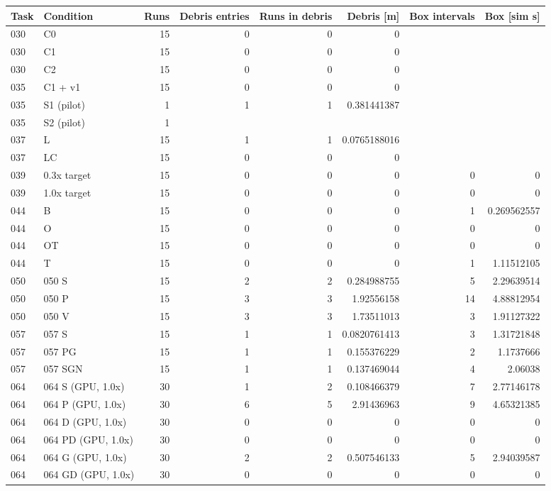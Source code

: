 \begin{tabular}{llrrrrrr}
\hline
Task & Condition & Runs & Debris entries & Runs in debris & Debris [m] & Box intervals & Box [sim s] \\
\hline
030 & C0 & 15 & 0 & 0 & 0 & \textemdash{} & \textemdash{} \\
030 & C1 & 15 & 0 & 0 & 0 & \textemdash{} & \textemdash{} \\
030 & C2 & 15 & 0 & 0 & 0 & \textemdash{} & \textemdash{} \\
035 & C1 + v1 & 15 & 0 & 0 & 0 & \textemdash{} & \textemdash{} \\
035 & S1 (pilot) & 1 & 1 & 1 & 0.381441387 & \textemdash{} & \textemdash{} \\
035 & S2 (pilot) & 1 & \textemdash{} & \textemdash{} & \textemdash{} & \textemdash{} & \textemdash{} \\
037 & L & 15 & 1 & 1 & 0.0765188016 & \textemdash{} & \textemdash{} \\
037 & LC & 15 & 0 & 0 & 0 & \textemdash{} & \textemdash{} \\
039 & 0.3x target & 15 & 0 & 0 & 0 & 0 & 0 \\
039 & 1.0x target & 15 & 0 & 0 & 0 & 0 & 0 \\
044 & B & 15 & 0 & 0 & 0 & 1 & 0.269562557 \\
044 & O & 15 & 0 & 0 & 0 & 0 & 0 \\
044 & OT & 15 & 0 & 0 & 0 & 0 & 0 \\
044 & T & 15 & 0 & 0 & 0 & 1 & 1.11512105 \\
050 & 050 S & 15 & 2 & 2 & 0.284988755 & 5 & 2.29639514 \\
050 & 050 P & 15 & 3 & 3 & 1.92556158 & 14 & 4.88812954 \\
050 & 050 V & 15 & 3 & 3 & 1.73511013 & 3 & 1.91127322 \\
057 & 057 S & 15 & 1 & 1 & 0.0820761413 & 3 & 1.31721848 \\
057 & 057 PG & 15 & 1 & 1 & 0.155376229 & 2 & 1.1737666 \\
057 & 057 SGN & 15 & 1 & 1 & 0.137469044 & 4 & 2.06038 \\
064 & 064 S (GPU, 1.0x) & 30 & 1 & 2 & 0.108466379 & 7 & 2.77146178 \\
064 & 064 P (GPU, 1.0x) & 30 & 6 & 5 & 2.91436963 & 9 & 4.65321385 \\
064 & 064 D (GPU, 1.0x) & 30 & 0 & 0 & 0 & 0 & 0 \\
064 & 064 PD (GPU, 1.0x) & 30 & 0 & 0 & 0 & 0 & 0 \\
064 & 064 G (GPU, 1.0x) & 30 & 2 & 2 & 0.507546133 & 5 & 2.94039587 \\
064 & 064 GD (GPU, 1.0x) & 30 & 0 & 0 & 0 & 0 & 0 \\
\hline
\end{tabular}
